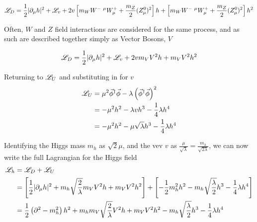     \begin{equation} \begin{split}
        \mathscr{L}_D = \frac{1}{2} | \partial_{\mu}h |^2 + \mathscr{L}_v
            + 2v\left[ m_W W^{-\ \mu} W^+_{\mu} + \frac{m_Z}{2} (Z^0_{\mu})^2 \right] h
            + \left[ m_W W^{-\ \mu} W^+_{\mu} + \frac{m_Z}{2} (Z^0_{\mu})^2 \right] h^2
    \end{split} \end{equation}

    Often, $W$ and $Z$ field interactions are considered for the same process,
        and as such are described together simply as Vector Bosons, $V$

    \begin{equation} \begin{split}
        \mathscr{L}_D = \frac{1}{2} | \partial_{\mu}h |^2 + \mathscr{L}_v
            + 2 v m_V V^2 h + m_V V^2 h^2
    \end{split} \end{equation}

    Returning to $\mathscr{L}_U$ and substituting in for $v$
    \begin{equation} \begin{split}
        \mathscr{L}_U &= \mu^2 \vec{\phi}^\dag \vec{\phi} - \lambda \left( \vec{\phi}^\dag\vec{\phi} \right)^2
        \\&= - \mu^2 h^2 -\lambda v h^3 - \frac{1}{4} \lambda h^4
        \\&= - \mu^2 h^2 - \mu \sqrt\lambda h^3 - \frac{1}{4} \lambda h^4
    \end{split} \end{equation}

    Identifying the Higgs mass $m_h$ as $\sqrt{2}\mu$, and the vev $v$ as $\frac{\mu}{\sqrt{\lambda}} = \frac{m_h}{\sqrt{2 \lambda}}$,
    we can now write the full Lagrangian for the Higgs field\cite{Halzen_book}
    \begin{equation} \begin{split} \label{eq:higgsfull}
        \mathscr{L}_h &= \mathscr{L}_D + \mathscr{L}_U
        \\&= \left[ \frac{1}{2} | \partial_{\mu}h |^2
            + m_h \sqrt{\frac{2}{\lambda}}  m_V V^2 h + m_V V^2 h^2 \right]
            + \left[ - \frac{1}{2} m^2_h h^2 - m_h \sqrt{\frac{\lambda}{2}} h^3 - \frac{1}{4} \lambda h^4 \right]
        \\&= \frac{1}{2} \left(\partial^2 - m_h^2 \right) h^2
            + m_h m_V \sqrt{\frac{2}{\lambda}} V^2 h + m_V V^2 h^2
            - m_h \sqrt{\frac{\lambda}{2}} h^3 - \frac{1}{4} \lambda h^4
    \end{split} \end{equation}

